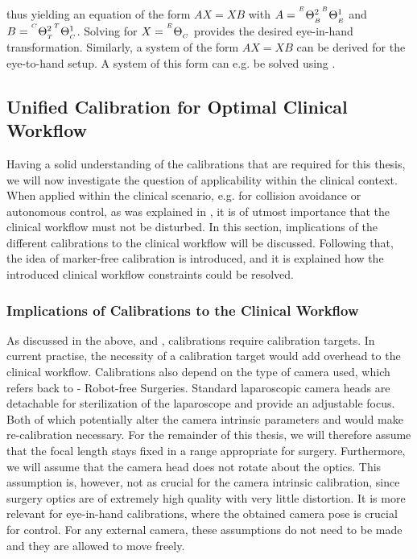 thus yielding an equation of the form $AX = XB$ with $A={}^{^E}\Theta_{_B}^{2}{}^{^B}\Theta_{_E}^{1}$ and $B={}^{^C}\Theta_{_T}^{2}{}^{^T}\Theta_{_C}^{1}$. Solving for $X={}^{^E}\Theta_{_C}$ provides the desired eye-in-hand transformation. Similarly, a system of the form $AX = XB$ can be derived for the eye-to-hand setup. A system of this form can e.g. be solved using \cite{tsai1989new, park1994robot, horaud1995hand}.


\subsection{Unified Calibration for Optimal Clinical Workflow}
\label{in:sec:unified_calibration}
Having a solid understanding of the calibrations that are required for this thesis, we will now investigate the question of applicability within the clinical context. When applied within the clinical scenario, e.g. for collision avoidance or autonomous control, as was explained in , it is of utmost importance that the clinical workflow must not be disturbed. In this section, implications of the different calibrations to the clinical workflow will be discussed. Following that, the idea of marker-free calibration is introduced, and it is explained how the introduced clinical workflow constraints could be resolved.

\subsubsection{Implications of Calibrations to the Clinical Workflow}
As discussed in the above,  and , calibrations require calibration targets. In current practise, the necessity of a calibration target would add overhead to the clinical workflow. Calibrations also depend on the type of camera used, which refers back to  - Robot-free Surgeries. Standard laparoscopic camera heads are detachable for sterilization of the laparoscope and provide an adjustable focus. Both of which potentially alter the camera intrinsic parameters and would make re-calibration necessary. For the remainder of this thesis, we will therefore assume that the focal length stays fixed in a range appropriate for surgery. Furthermore, we will assume that the camera head does not rotate about the optics. This assumption is, however, not as crucial for the camera intrinsic calibration, since surgery optics are of extremely high quality with very little distortion. It is more relevant for eye-in-hand calibrations, where the obtained camera pose is crucial for control. For any external camera, these assumptions do not need to be made and they are allowed to move freely.

